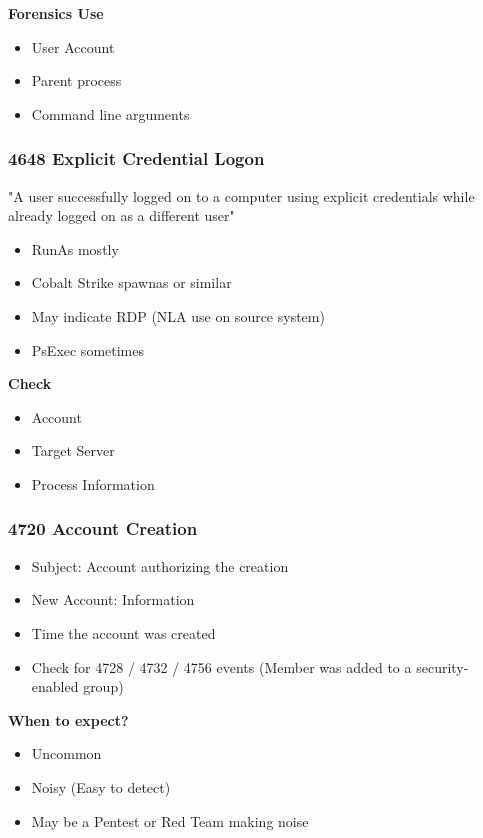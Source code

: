 \textbf{Forensics Use}

\begin{itemize}
   \item User Account
   \item Parent process  
   \item Command line arguments
\end{itemize}

\subsubsection*{4648 Explicit Credential Logon}

"A user successfully logged on to a computer using explicit credentials while already logged on as a different user"

\begin{itemize}
   \item RunAs mostly
   \item Cobalt Strike spawnas or similar
   \item May indicate RDP (NLA use on source system)
   \item PsExec sometimes
\end{itemize}

\textbf{Check}
\begin{itemize}
   \item Account
   \item Target Server
   \item Process Information
\end{itemize}

\subsubsection*{4720 Account Creation}

\begin{itemize}
   \item Subject: Account authorizing the creation
   \item New Account: Information 
   \item Time the account was created
   \item Check for 4728 / 4732 / 4756 events (Member was added to a security-enabled group)
\end{itemize}

\textbf{When to expect?}

\begin{itemize}
   \item Uncommon
   \item Noisy (Easy to detect)
   \item May be a Pentest or Red Team making noise
\end{itemize}

